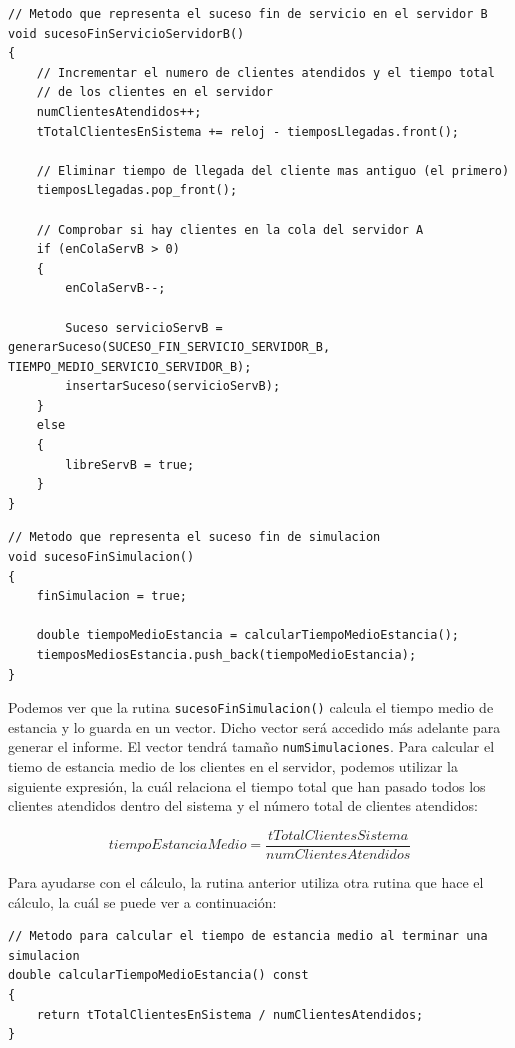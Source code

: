 \documentclass[11pt,a4paper]{article}
\begin{document}
\begin{lstlisting}
// Metodo que representa el suceso fin de servicio en el servidor B
void sucesoFinServicioServidorB()
{
	// Incrementar el numero de clientes atendidos y el tiempo total
    // de los clientes en el servidor
    numClientesAtendidos++;
    tTotalClientesEnSistema += reloj - tiemposLlegadas.front();

    // Eliminar tiempo de llegada del cliente mas antiguo (el primero)
    tiemposLlegadas.pop_front();

    // Comprobar si hay clientes en la cola del servidor A
    if (enColaServB > 0)
    {
    	enColaServB--;
    	
    	Suceso servicioServB = generarSuceso(SUCESO_FIN_SERVICIO_SERVIDOR_B, TIEMPO_MEDIO_SERVICIO_SERVIDOR_B);
		insertarSuceso(servicioServB);
	}
    else
    {
    	libreServB = true;
	}
}
\end{lstlisting}

\begin{lstlisting}
// Metodo que representa el suceso fin de simulacion
void sucesoFinSimulacion()
{
	finSimulacion = true;

	double tiempoMedioEstancia = calcularTiempoMedioEstancia();
    tiemposMediosEstancia.push_back(tiempoMedioEstancia);
}
\end{lstlisting}

Podemos ver que la rutina \texttt{sucesoFinSimulacion()} calcula el tiempo medio de estancia
y lo guarda en un vector. Dicho vector será accedido más adelante para generar el informe. El
vector tendrá tamaño \texttt{numSimulaciones}. Para calcular el tiemo de estancia medio de los
clientes en el servidor, podemos utilizar la siguiente expresión, la cuál relaciona el tiempo
total que han pasado todos los clientes atendidos dentro del sistema y el número total de clientes
atendidos:

\begin{equation}
	tiempoEstanciaMedio = \frac{tTotalClientesSistema}{numClientesAtendidos}
\end{equation}

Para ayudarse con el cálculo, la rutina anterior utiliza otra rutina que hace el cálculo,
la cuál se puede ver a continuación:

\begin{lstlisting}
// Metodo para calcular el tiempo de estancia medio al terminar una simulacion
double calcularTiempoMedioEstancia() const
{
	return tTotalClientesEnSistema / numClientesAtendidos;
}
\end{lstlisting}
\end{document}
